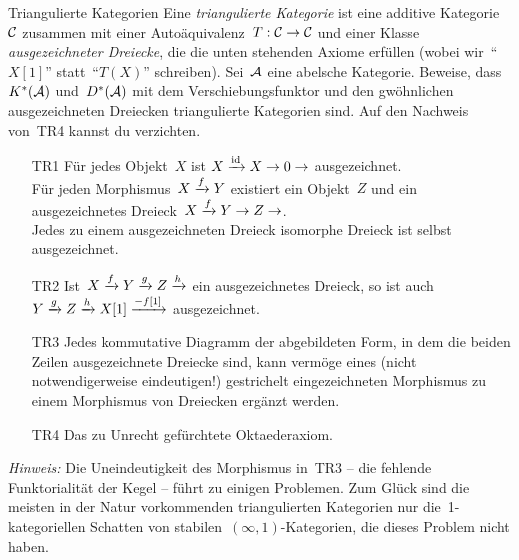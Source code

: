 \documentclass{uebblatt}
\begin{document}
\begin{aufgabe}{Triangulierte Kategorien}
Eine \emph{triangulierte Kategorie} ist eine additive Kategorie~$\mathcal{C}$ zusammen
mit einer Autoäquivalenz~$T : \mathcal{C} \to \mathcal{C}$ und einer Klasse \emph{ausgezeichneter
Dreiecke}, die die unten stehenden Axiome erfüllen (wobei wir~"`$X[1]$"' statt~"`$T(X)$"'
schreiben). Sei~$\mathcal{A}$ eine abelsche Kategorie. Beweise, dass~$K^*(\mathcal{A})$ und~$D^*(\mathcal{A})$
mit dem Verschiebungsfunktor und den gwöhnlichen ausgezeichneten Dreiecken
triangulierte Kategorien sind. Auf den Nachweis von~TR4 kannst du
verzichten.\par
\begin{scriptsize}
\begin{itemize}
\item[TR1] Für jedes Objekt~$X$ ist $X \xrightarrow{\mathrm{id}} X \to 0 \to$
ausgezeichnet.\\[-1.3em]

Für jeden Morphismus~$X \xrightarrow{f} Y$ existiert ein Objekt~$Z$ und ein
ausgezeichnetes Dreieck~$X \xrightarrow{f} Y \to Z \to$.\\[-1.3em]

Jedes zu einem ausgezeichneten Dreieck isomorphe Dreieck ist selbst
ausgezeichnet.

\item[TR2] Ist~$X \xrightarrow{f} Y \xrightarrow{g} Z \xrightarrow{h}$ ein ausgezeichnetes Dreieck, so
ist auch $Y \xrightarrow{g} Z \xrightarrow{h} X[1] \xrightarrow{-f[1]}$ ausgezeichnet.

\item[TR3] Jedes kommutative Diagramm der abgebildeten Form, in dem die beiden Zeilen
ausgezeichnete Dreiecke sind, kann vermöge eines (nicht notwendigerweise
eindeutigen!) gestrichelt eingezeichneten Morphismus zu einem Morphismus von
Dreiecken ergänzt werden.

\item[TR4] Das zu Unrecht gefürchtete Oktaederaxiom.
\end{itemize}
\end{scriptsize}

\begin{minipage}{0.8\textwidth}{\tiny\emph{Hinweis:} Die Uneindeutigkeit des Morphismus in~TR3 -- die fehlende
Funktorialität der Kegel -- führt zu einigen Problemen. Zum Glück sind die
meisten in der Natur vorkommenden triangulierten Kategorien nur
die~1-kategoriellen Schatten von stabilen~$(\infty,1)$-Kategorien, die dieses
Problem nicht haben.\par}\end{minipage}
\end{aufgabe}
\end{document}

